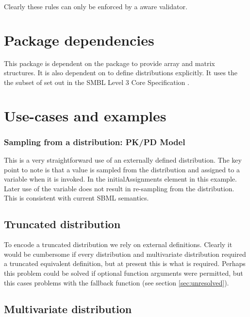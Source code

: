 \documentclass[draftspec]{sbmlpkgspec}
\begin{document}
Clearly these rules can only be enforced by a \distribshort aware validator.

\section{Package dependencies}

This package is dependent on the \arrays package to provide array and
matrix structures. It is also dependent on \mathml \cite{mathml2} to
define distributions explicitly. It uses the the subset of \mathml set
out in the SMBL Level 3 Core Specification
\cite{l3v1c}.

\section{Use-cases and examples}

\subsubsection{Sampling from a distribution: PK/PD Model}

This is a very straightforward use of an externally defined
distribution. The key point to note is that a value is sampled from
the distribution and assigned to a variable when it is invoked. In the
initialAssignments element in this example. Later use of the variable
does not result in re-sampling from the distribution. This is
consistent with current SBML semantics.


\subsection{Truncated distribution}
\label{sec: truncated-eg}

To encode a truncated distribution we rely on external
definitions. Clearly it would be cumbersome if every distribution and
multivariate distribution required a truncated equivalent definition,
but at present this is what is required\contraversial. Perhaps this
problem could be solved if optional function arguments were permitted,
but this cases problems with the fallback function (see section \ref{sec:unresolved}).


\subsection{Multivariate distribution}
\end{document}
